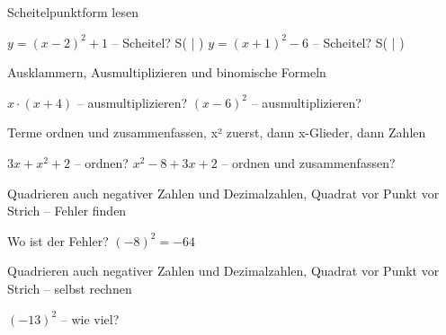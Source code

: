 \begin{aufgabe}{Scheitelpunktform lesen}
\begin{teile}
\teil $y = (x - 2)^2 + 1$ – Scheitel? S( \leerfeld | \leerfeld )
\teil $y = (x + 1)^2 - 6$ – Scheitel? S( \leerfeld | \leerfeld )
\end{teile}
\end{aufgabe}

\begin{aufgabe}{Ausklammern, Ausmultiplizieren und binomische Formeln}
\begin{teile}
\teil $x \cdot (x + 4)$ – ausmultiplizieren? \leerfeld
\teil $(x - 6)^2$ – ausmultiplizieren? \leerfeld
\end{teile}
\end{aufgabe}

\begin{aufgabe}{Terme ordnen und zusammenfassen, x² zuerst, dann x-Glieder, dann Zahlen}
\begin{teile}
\teil $3x + x^2 + 2$ – ordnen? \leerfeld
\teil $x^2 - 8 + 3x + 2$ – ordnen und zusammenfassen? \leerfeld
\end{teile}
\end{aufgabe}

\begin{aufgabe}{Quadrieren auch negativer Zahlen und Dezimalzahlen, Quadrat vor Punkt vor Strich – Fehler finden}
\begin{teile}
\teil Wo ist der Fehler? $(-8)^2 = -64$
\end{teile}
\end{aufgabe}

\begin{aufgabe}{Quadrieren auch negativer Zahlen und Dezimalzahlen, Quadrat vor Punkt vor Strich – selbst rechnen}
\begin{teile}
\teil $(-13)^2$ – wie viel? \leerfeld
\end{teile}
\end{aufgabe}
